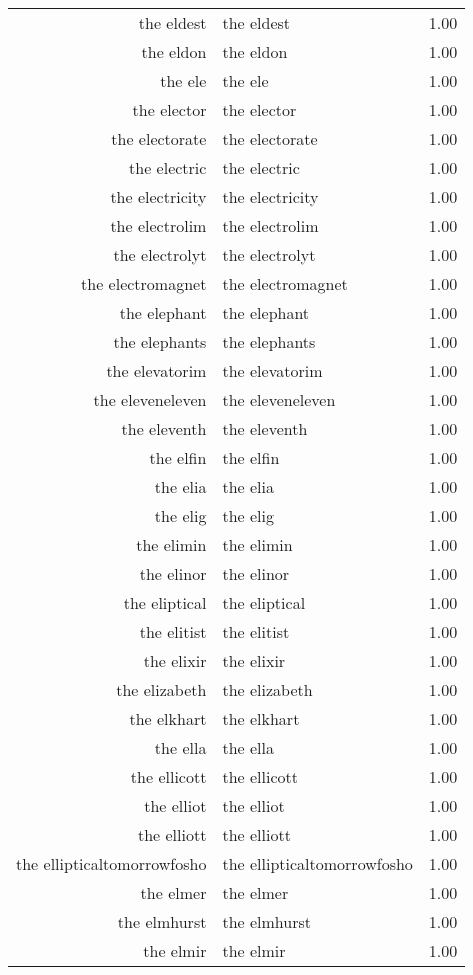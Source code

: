 \begin{table}[ht]
\begin{tabular}{rlr}
  the eldest & the eldest & 1.00 \\ 
  the eldon & the eldon & 1.00 \\ 
  the ele & the ele & 1.00 \\ 
  the elector & the elector & 1.00 \\ 
  the electorate & the electorate & 1.00 \\ 
  the electric & the electric & 1.00 \\ 
  the electricity & the electricity & 1.00 \\ 
  the electrolim & the electrolim & 1.00 \\ 
  the electrolyt & the electrolyt & 1.00 \\ 
  the electromagnet & the electromagnet & 1.00 \\ 
  the elephant & the elephant & 1.00 \\ 
  the elephants & the elephants & 1.00 \\ 
  the elevatorim & the elevatorim & 1.00 \\ 
  the eleveneleven & the eleveneleven & 1.00 \\ 
  the eleventh & the eleventh & 1.00 \\ 
  the elfin & the elfin & 1.00 \\ 
  the elia & the elia & 1.00 \\ 
  the elig & the elig & 1.00 \\ 
  the elimin & the elimin & 1.00 \\ 
  the elinor & the elinor & 1.00 \\ 
  the eliptical & the eliptical & 1.00 \\ 
  the elitist & the elitist & 1.00 \\ 
  the elixir & the elixir & 1.00 \\ 
  the elizabeth & the elizabeth & 1.00 \\ 
  the elkhart & the elkhart & 1.00 \\ 
  the ella & the ella & 1.00 \\ 
  the ellicott & the ellicott & 1.00 \\ 
  the elliot & the elliot & 1.00 \\ 
  the elliott & the elliott & 1.00 \\ 
  the ellipticaltomorrowfosho & the ellipticaltomorrowfosho & 1.00 \\ 
  the elmer & the elmer & 1.00 \\ 
  the elmhurst & the elmhurst & 1.00 \\ 
  the elmir & the elmir & 1.00 \\ 

\end{tabular}
\end{table}
